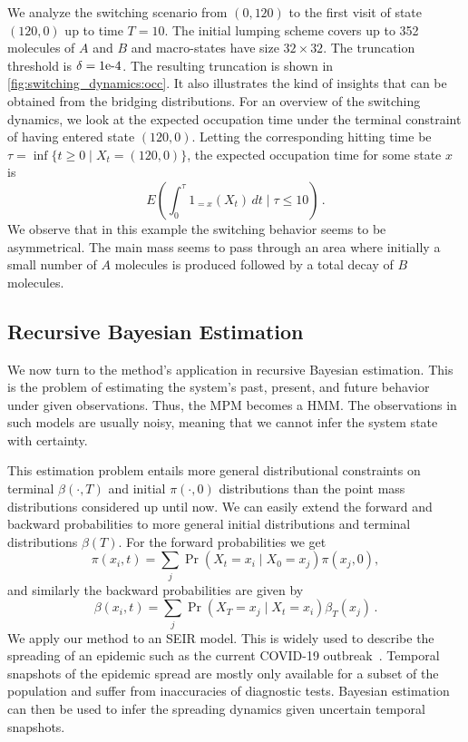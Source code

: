 We analyze the switching scenario from $(0, 120)$ to the first visit of state $(120, 0)$ up to time $T=10$. The initial lumping scheme covers up to 352 molecules of $A$ and $B$ and  macro-states have size $32\times32$.
The truncation threshold is $\delta= \text{1e-4} $.
The resulting truncation is shown in \autoref{fig:switching_dynamics:occ}.
It also illustrates the kind of insights that can be obtained from the bridging distributions.
For an overview of the switching dynamics, we look at the expected occupation time under the terminal constraint of having entered state $(120,0)$. Letting the corresponding hitting time be $\tau=\inf\{t\geq 0\mid X_t=(120, 0)\}$, the expected occupation time for some state $x$ is
$$E\left(\int_0^{\tau}1_{=x}(X_t)\,dt\mid \tau\leq 10\right)\,.$$
We observe that in this example the switching  behavior seems to be asymmetrical.
The main mass seems to pass through an area where initially a small number of $A$ molecules is produced followed by a total decay of $B$ molecules.


\subsection{Recursive Bayesian Estimation}
We now turn to the method's application in recursive Bayesian estimation.
This is the problem of estimating the system's
past, present, and future behavior under given observations.
Thus, the \ac{MPM} becomes a \acf{HMM}.
The observations in such models are usually noisy, meaning that we cannot infer the system state with certainty.

This estimation problem entails more general distributional constraints on terminal $\beta(\cdot,T)$ and initial $\pi(\cdot, 0)$ distributions than the point mass distributions considered up until now.
We can easily extend the forward and backward probabilities to more general initial
distributions   and terminal distributions $\beta(T)$.
For the forward probabilities we get
\begin{equation}
    \pi(x_i, t) = \sum_j \Pr(X_t=x_i\mid X_0=x_j) \pi(x_j,0),
\end{equation}
and similarly the backward probabilities are given by
\begin{equation}
    \beta(x_i, t) = \sum_j\Pr(X_T=x_j\mid X_t = x_i) \beta_T(x_j)\,.
\end{equation}
We apply our method to an \acf{SEIR} model.
This is widely used to describe the spreading of an epidemic such as the current COVID-19 outbreak~\cite{he2020seir,grossmann2020importance}.
Temporal snapshots of the epidemic spread  are mostly only available for a subset of the population and suffer from   inaccuracies of diagnostic tests.
Bayesian estimation can then be used to infer the spreading dynamics given uncertain temporal snapshots.

